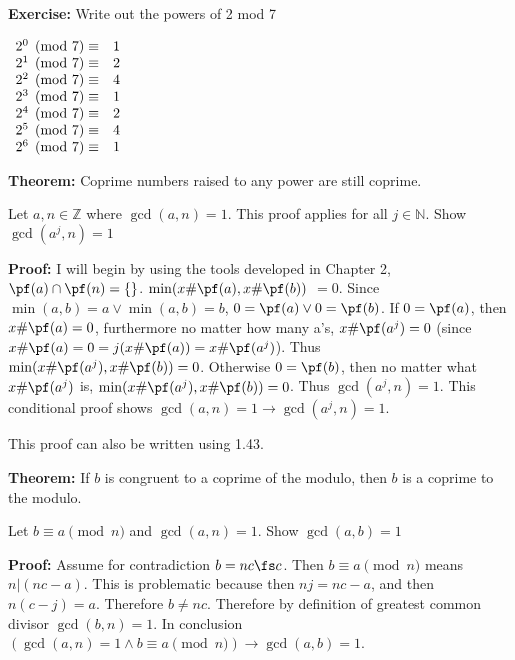 \item \textbf{Exercise:} Write out the powers of 2 mod 7

\(
\begin{array}[t]{ll}
2^0 \pmod 7 \equiv & 1 \\
2^1 \pmod 7 \equiv & 2 \\
2^2 \pmod 7 \equiv & 4 \\
2^3 \pmod 7 \equiv & 1 \\
2^4 \pmod 7 \equiv & 2 \\
2^5 \pmod 7 \equiv & 4 \\
2^6 \pmod 7 \equiv & 1 \\
\end{array}
\)

\item \textbf{Theorem:} Coprime numbers raised to any power are still coprime.

Let \(a, n \in \mathbb Z\) where \(\gcd(a, n) = 1\). This proof applies for all \(j \in \mathbb N\). Show \(\gcd(a^j, n) = 1\)

\textbf{Proof:} I will begin by using the tools developed in Chapter 2, \(\pf(a) \cap \pf(n)  = \{\}\). \(\min (x \# \pf(a), x \# \pf(b))\) \( = 0\). Since \(\min(a, b) = a \vee \min(a, b) = b\), \(0 = \pf(a) \vee 0 = \pf(b)\). If \(0 = \pf(a)\), then \(x \# \pf(a) = 0\), furthermore no matter how many a's, \(x \# \pf(a^j) = 0\) (since \(x \# \pf(a) = 0 = j (x \# \pf(a)) = x \# \pf(a^j)\)). Thus \(\min(x \# \pf(a^j), x \# \pf(b)) = 0\). Otherwise \(0 = \pf(b)\), then no matter what \(x \# \pf(a^j)\) is, \(\min(x \# \pf(a^j), x \# \pf(b)) = 0\). Thus \(\gcd(a^j, n) = 1\). This conditional proof shows \(\gcd(a, n) = 1 \rightarrow \gcd(a^j, n) = 1\). \qedhere

This proof can also be written using 1.43.

\item \textbf{Theorem:} If \(b\) is congruent to a coprime of the modulo, then \(b\) is a coprime to the modulo.

Let \(b \equiv a \pmod n\) and \(\gcd(a, n) = 1\). Show \(\gcd(a, b) = 1\)

\textbf{Proof:} Assume for contradiction \(b = n c \fs c\). Then \(b \equiv a \pmod n\) means \(n | (nc - a)\). This is problematic because then \(nj = nc - a\), and then \(n(c-j) = a\). Therefore \(b \neq nc\). Therefore by definition of greatest common divisor \(\gcd(b, n) = 1\). In conclusion \((\gcd(a, n) = 1 \wedge b \equiv a \pmod n) \rightarrow \gcd(a, b) = 1\). \qedhere

